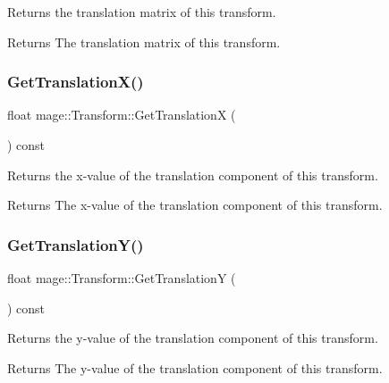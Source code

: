 Returns the translation matrix of this transform.

\begin{DoxyReturn}{Returns}
The translation matrix of this transform. 
\end{DoxyReturn}
\hypertarget{structmage_1_1_transform_a171525f6ba157e319646548f2c459395}{}\label{structmage_1_1_transform_a171525f6ba157e319646548f2c459395} 
\subsubsection{\texorpdfstring{Get\+Translation\+X()}{GetTranslationX()}}
{\footnotesize\ttfamily float mage\+::\+Transform\+::\+Get\+TranslationX (\begin{DoxyParamCaption}{ }\end{DoxyParamCaption}) const}

Returns the x-\/value of the translation component of this transform.

\begin{DoxyReturn}{Returns}
The x-\/value of the translation component of this transform. 
\end{DoxyReturn}
\hypertarget{structmage_1_1_transform_a7feba3c1d24a986e440dd6571edc14b2}{}\label{structmage_1_1_transform_a7feba3c1d24a986e440dd6571edc14b2} 
\subsubsection{\texorpdfstring{Get\+Translation\+Y()}{GetTranslationY()}}
{\footnotesize\ttfamily float mage\+::\+Transform\+::\+Get\+TranslationY (\begin{DoxyParamCaption}{ }\end{DoxyParamCaption}) const}

Returns the y-\/value of the translation component of this transform.

\begin{DoxyReturn}{Returns}
The y-\/value of the translation component of this transform. 
\end{DoxyReturn}
\hypertarget{structmage_1_1_transform_a023ce9ea6afaaa80776b4d43957964bf}{}\label{structmage_1_1_transform_a023ce9ea6afaaa80776b4d43957964bf} 
